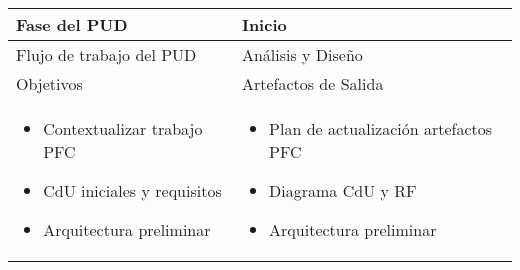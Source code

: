 \vspace{1cm}
\begin{tabular}{|p{}|p{}|}

\hline

\cellcolor[gray]{0.7}Fase del \acs{PUD} & Inicio 
 \\
\hline

\cellcolor[gray]{0.7}Flujo de trabajo del \acs{PUD} & Análisis y Diseño
 \\
\hline

\cellcolor[gray]{0.7}Objetivos  &
\cellcolor[gray]{0.7}Artefactos de Salida \\
\hline

\begin{itemize}
\item Contextualizar trabajo \acs{PFC}
\item \acs{CdU} iniciales y requisitos
\item Arquitectura preliminar
\end{itemize}

&

\begin{itemize}
\item Plan de actualización artefactos \acs{PFC}
\item Diagrama \acs{CdU} y \acf{RF}
\item Arquitectura preliminar
\end{itemize} \\
\hline
\end{tabular}


